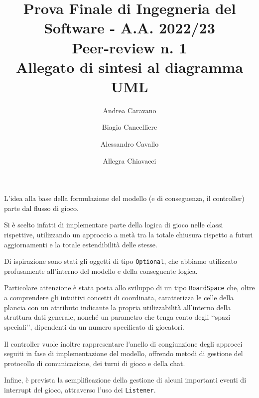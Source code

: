 \documentclass[a4paper,11pt]{article} %
\begin{document}
    \pagestyle{fancy}
    \fancyhead{}\fancyfoot{}
    \fancyfoot[C]{\thepage}

    \author{Andrea Caravano \and Biagio Cancelliere \and Alessandro Cavallo \and Allegra Chiavacci}
    \title{\textbf{\Large{Prova Finale di Ingegneria del Software - A.A. 2022/23\\Peer-review n. 1\\Allegato di sintesi al diagramma UML}}}
    \maketitle

    \section*{}
    L'idea alla base della formulazione del modello (e di conseguenza, il controller) parte dal flusso di gioco.

    \medskip

    Si è scelto infatti di implementare parte della logica di gioco nelle classi rispettive, utilizzando un approccio a metà tra la totale chiusura rispetto a futuri aggiornamenti e la totale estendibilità delle stesse.

    \medskip

    Di ispirazione sono stati gli oggetti di tipo \texttt{Optional}, che abbiamo utilizzato profusamente all'interno del modello e della conseguente logica.

    \medskip

    Particolare attenzione è stata posta allo sviluppo di un tipo \texttt{BoardSpace} che, oltre a comprendere gli intuitivi concetti di coordinata,
    caratterizza le celle della plancia con un attributo indicante la propria utilizzabilità all'interno della struttura dati generale, nonché un parametro che
    tenga conto degli ‘‘spazi speciali’’, dipendenti da un numero specificato di giocatori.

    \medskip

    Il controller vuole inoltre rappresentare l'anello di congiunzione degli approcci seguiti in fase di implementazione del modello, offrendo
    metodi di gestione del protocollo di comunicazione, dei turni di gioco e della chat.

    \medskip

    Infine, è prevista la semplificazione della gestione di alcuni importanti eventi di interrupt del gioco, attraverso l'uso dei \texttt{Listener}.
\end{document}
